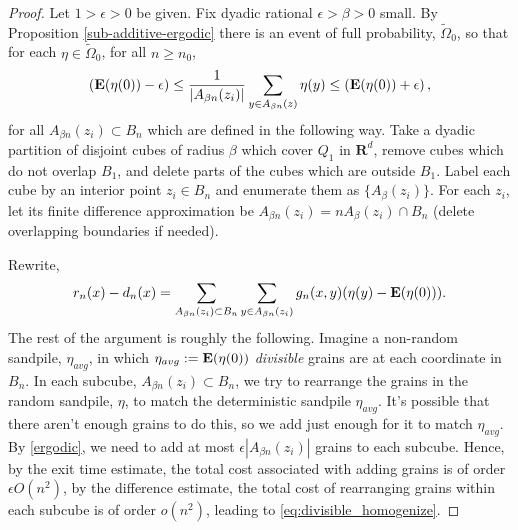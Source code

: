 \documentclass[12pt]{amsart}
\newcommand{\R}{\mathbf{R}}
\newcommand{\E}{\mathop{\bf E{}}}
\begin{document}
\begin{proof} 
	 Let $1 > \epsilon > 0$ be given.  Fix dyadic rational $\epsilon > \beta > 0$ small. By Proposition \ref{sub-additive-ergodic} there is an event of full probability, $\tilde{\Omega}_0$, so that for each $\eta \in \tilde{\Omega}_0$, for all $n \geq n_0$, 
\begin{equation}\label{ergodic}
\left( \E(\eta(0)) - \epsilon \right) \leq \frac{1}{|A_{\beta n}(z_i)|} \sum_{y \in A_{\beta n}(z)} \eta(y) \leq \left(  \E(\eta(0)) + \epsilon \right), 
\end{equation} 
 for all $A_{\beta n}(z_i) \subset B_{n}$ which are defined in the following way. 
Take a dyadic partition of disjoint cubes of radius $\beta$ which cover
$Q_1$ in $\R^d$, remove cubes which do not overlap $B_1$, and delete parts of the cubes which are outside $B_1$. Label each cube by an interior point $z_i \in B_n$ and enumerate them as $\{A_{\beta}(z_i)\}$. For each $z_i$, let its finite difference approximation be $A_{\beta n}(z_i) = n A_{\beta}(z_i) \cap B_n$ (delete overlapping boundaries if needed). 



Rewrite, 
\begin{equation}\label{eq1}
r_n(x) - d_n(x) = \sum_{A_{\beta n}(z_i) \subset B_{n}} \sum_{y \in A_{\beta n}(z_i)} g_{n}(x,y) (\eta(y) - \E(\eta(0))).
\end{equation}
The rest of the argument is roughly the following. Imagine a non-random sandpile, $\eta_{avg}$,
in which $\eta_{avg} := \E(\eta(0))$ {\it divisible} grains are at each coordinate in $B_n$. In each subcube, $A_{\beta n}(z_i) \subset B_n$, we try to rearrange the grains in the random sandpile, $\eta$, to 
match the deterministic sandpile $\eta_{avg}$. It's possible that there aren't enough grains to do this, so we add just enough for it to match $\eta_{avg}$.  By \eqref{ergodic}, we need to add at most $\epsilon |A_{\beta n}(z_i)|$ grains to each subcube.
Hence, by the exit time estimate, the total cost associated with adding grains is of order $\epsilon O(n^2)$, by the difference estimate, the total cost of rearranging grains within each subcube is of order $o(n^2)$, leading to \eqref{eq:divisible_homogenize}. 
 

\end{proof}
\end{document}
